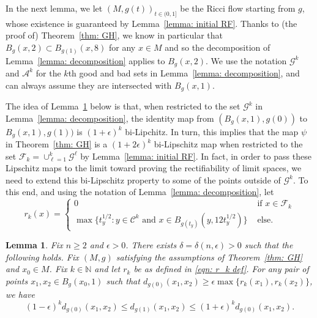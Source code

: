 \documentclass[11pt,reqno]{amsart}
\newtheorem{lemma}[theorem]{Lemma}
\theoremstyle{remark}
\theoremstyle{definition}
\numberwithin{equation}{section}
\newcommand{\e}{{\epsilon}}
\begin{document}
In the next lemma, we let $(M,g(t))_{t \in (0,1]}$ be the Ricci flow starting from $g$, whose existence is guaranteed by Lemma~\ref{lemma: initial RF}. Thanks to (the proof of) Theorem~\ref{thm: GH}, we know in particular that $B_g(x,2) \subset B_{g(1)}(x,8)$ for any $x \in M$ and so the decomposition of Lemma~\ref{lemma: decomposition} applies to $B_g(x,2).$ We use the notation $\mathcal{G}^k$ and $\mathcal{A}^k$ for the $k$th good and bad sets in Lemma~\ref{lemma: decomposition}, and can always assume they are intersected with $B_g(x,1)$.

 The idea of Lemma~\ref{rmk: content bound replacement} below is that, when restricted to the set $\mathcal{G}^k$ in Lemma~\ref{lemma: decomposition}, the identity map from $(B_g(x,1), g(0))$ to $B_g(x,1), g(1))$ is  $(1+\e)^k$ bi-Lipchitz. In turn, this implies that the map $\psi$ in Theorem~\ref{thm: GH} is a $(1+2\e)^k$ bi-Lipschitz map when restricted to the set $\mathcal{F}_k  = \cup_{\ell=1}^k \mathcal{G}^{\ell}$ by Lemma~\ref{lemma: initial RF}. In fact, in order to pass these Lipschitz maps to the limit toward proving the rectifiability of limit spaces, we need to extend this bi-Lipschitz property to some of the points outside of $\mathcal{G}^k$. To this end, and using the notation of Lemma~\ref{lemma: decomposition}, let 
		\begin{equation}\label{eqn: r_k def}
		r_k(x)=\begin{cases} 0 & \text{ if } x \in \mathcal{F}_k\\
			\max\{ t_y^{1/2} : y \in \mathcal{C}^k \text{ and } x \in B_{g(t_y)}(y, 12t_y^{1/2}) \}& \text{ else}.
		\end{cases} 
		\end{equation} 
\begin{lemma}
\label{rmk: content bound replacement}
Fix $n \geq 2$ and $\e>0$. There exists $\delta=\delta(n,\e )>0$ such that the following holds. Fix $(M,g)$ satisfying the assumptions of Theorem~\ref{thm: GH} and  $x_0\in M$. Fix $k \in \mathbb{N}$ and let  $r_k$ be as defined in \eqref{eqn: r_k def}. For any pair of points $x_1, x_2 \in B_g(x_0,1)$ such that  $ d_{g(0)}(x_1, x_2) \geq \e \max\{r_k(x_1),r_k(x_2)\}$, we have
 \begin{equation}\label{eqn: lip large scales 1}
	(1-\e)^k d_{g(0)}(x_1,x_2) \leq d_{g(1)}(x_1,x_2) \leq (1+\e)^k d_{g(0)}(x_1,x_2).
	\end{equation}
\end{lemma}
\end{document}
